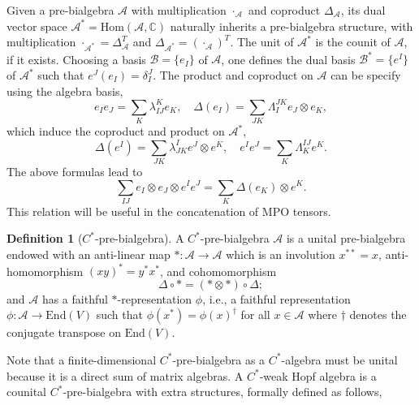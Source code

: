 \documentclass[prx, twocolumn, superscriptaddress, dvipsnames]{revtex4-2}
\theoremstyle{definition}
\newtheorem{defn}[thm]{Definition}
\newcommand{\ra}{\rightarrow}
\newcommand{\mA}{\mathcal{A}}
\newcommand{\dg}{\dagger}
\newcommand{\basis}{\mathcal{B}}
\begin{document}
Given a pre-bialgebra $\mA$ with multiplication $\cdot_\mA$ and coproduct $\Delta_\mA$, its dual vector space $\mA^*=\text{Hom}(\mA,\mathbb{C})$ naturally inherits a pre-bialgebra structure, with multiplication $\cdot_{\mA^*}=\Delta_\mA^T$ and $\Delta_{\mA^*}=(\cdot_\mA)^T$. The unit of $\mA^*$ is the counit of $\mA$, if it exists. Choosing a basis $\basis=\{e_I\}$ of $\mA$, one defines the dual basis $\basis^*=\{e^I\}$ of $\mA^*$ such that $e^J(e_I)=\delta^J_I$. The product and coproduct on $\mA$ can be specify using the algebra basis,
\begin{equation}
    e_I e_J=\sum_K \lambda_{IJ}^K e_K,\quad \Delta(e_I)=\sum_{JK} \Lambda_I^{JK} e_J \otimes e_K,
\end{equation}
which induce the coproduct and product on $\mA^*$,
\begin{equation}
    \Delta(e^I)=\sum_{JK} \lambda^I_{JK} e^J\otimes e^K,\quad e^I e^J=\sum_K \Lambda^{IJ}_K e^K.
\end{equation}
The above formulas lead to
\begin{equation}
\label{eqn:concatenate-two}
    \sum_{IJ} e_I\otimes e_J \otimes e^I e^J = \sum_K \Delta(e_K) \otimes e^K.
\end{equation}
This relation will be useful in the concatenation of MPO tensors. 

\begin{defn}[$C^*$-pre-bialgebra]
    A $C^*$-pre-bialgebra $\mA$ is a unital pre-bialgebra endowed with an anti-linear map $*:\mA\ra \mA$ which is an involution $x^{**}=x$, anti-homomorphism $(xy)^*=y^* x^*$, and cohomomorphism 
    \begin{equation}
    \Delta\circ *=(*\otimes *)\circ\Delta;    
    \end{equation}
    and $\mA$ has a faithful $*$-representation $\phi$, i.e., a faithful representation $\phi:\mA\ra \text{End}(V)$ such that  $\phi(x^*)=\phi(x)^\dg$ for all $x\in\mA$ where $\dg$ denotes the conjugate transpose on $\text{End}(V)$. 
\end{defn}

Note that a finite-dimensional $C^*$-pre-bialgebra as a $C^*$-algebra must be unital because it is a direct sum of matrix algebras. 
A $C^*$-weak Hopf algebra is a counital $C^*$-pre-bialgebra with extra structures, formally defined as follows,
\end{document}
